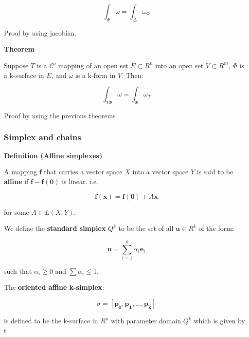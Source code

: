 \documentclass[11pt]{article}
\begin{document}
\[
\int_\Phi \omega = \int_\Delta \omega_\Phi
\]

Proof by using jacobian.

\textbf{Theorem}

Suppose \(T\) is a \(\mathcal{C}'\) mapping of an open set \(E \subset R^n\) into an open set \(V \subset R^m\), \(\Phi\) is a k-surface in \(E\), and \(\omega\) is a k-form in \(V\). Then:

\[
\int_{T\Phi} \omega = \int_\Phi \omega_T
\]

Proof by using the previous theorems


\subsubsection{Simplex and chains}
\label{sec:org5a91336}


\textbf{Definition (Affine simplexes)}

A mapping \(\bm{f}\) that carries a vector space \(X\) into a vector space \(Y\) is said to be \textbf{affine} if \(\bm{f} - \bm{f(0)}\) is linear. i.e.

\[
\bm{f(x) = f(0)} + A \bm{x}
\]

for some \(A \in L(X,Y)\).


We define the \textbf{standard simplex} \(Q^k\) to be the set of all \(\bm{u} \in R^k\) of the form:

\[
\bm{u} = \sum_{i=1}^k \alpha_i \bm{e}_i
\]

such that \(\alpha_i \geq 0\) and \(\sum\alpha_i \leq 1\).

The \textbf{oriented affine k-simplex}:

\[
\sigma = [\bm{p_0,p_1,\ldots,p_k}]
\]

is defined to be the k-surface in \(R^n\) with parameter domain \(Q^k\) which is given by t
\end{document}
